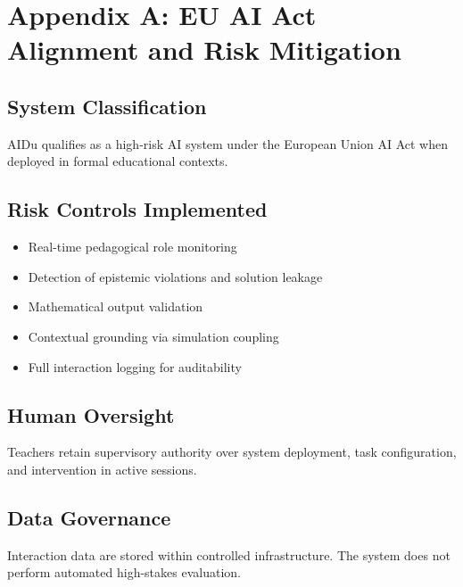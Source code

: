 
\appendix
\section*{Appendix A: EU AI Act Alignment and Risk Mitigation}

\subsection*{System Classification}

AIDu qualifies as a high-risk AI system under the European Union AI Act
when deployed in formal educational contexts.

\subsection*{Risk Controls Implemented}

\begin{itemize}
\item Real-time pedagogical role monitoring
\item Detection of epistemic violations and solution leakage
\item Mathematical output validation
\item Contextual grounding via simulation coupling
\item Full interaction logging for auditability
\end{itemize}

\subsection*{Human Oversight}

Teachers retain supervisory authority over system deployment,
task configuration, and intervention in active sessions.

\subsection*{Data Governance}

Interaction data are stored within controlled infrastructure.
The system does not perform automated high-stakes evaluation.